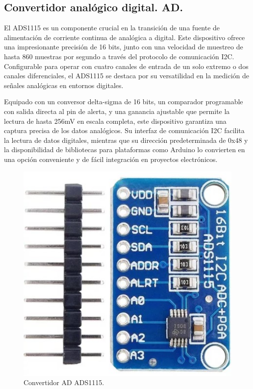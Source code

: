 \subsection{Convertidor analógico digital. AD.}
El ADS1115 es un componente crucial en la transición de una fuente de alimentación de corriente continua de analógica a digital. Este dispositivo ofrece una impresionante precisión de 16 bits, junto con una velocidad de muestreo de hasta 860 muestras por segundo a través del protocolo de comunicación I2C. Configurable para operar con cuatro canales de entrada de un solo extremo o dos canales diferenciales, el ADS1115 se destaca por su versatilidad en la medición de señales analógicas en entornos digitales. \par 
Equipado con un conversor delta-sigma de 16 bits, un comparador programable con salida directa al pin de alerta, y una ganancia ajustable que permite la lectura de hasta 256mV en escala completa, este dispositivo garantiza una captura precisa de los datos analógicos. Su interfaz de comunicación I2C facilita la lectura de datos digitales, mientras que su dirección predeterminada de 0x48 y la disponibilidad de bibliotecas para plataformas como Arduino lo convierten en una opción conveniente y de fácil integración en proyectos electrónicos.
\begin{figure}[H]
    \centering
    \includegraphics[scale=0.3]{./imagenes/ads1115.jpg}
    \caption{Convertidor AD ADS1115.}
    \label{F:ADC}
\end{figure}

